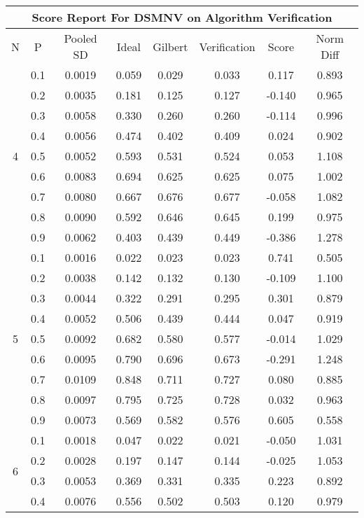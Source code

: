 \documentclass[11pt,a4paper]{report}
\begin{document}
\begin{longtable}{ | c | c || c | c | c | c | c | c | }
\hline
\multicolumn{8}{|c|}{ Score Report For DSMNV on Algorithm Verification} \\
\hline
N & P & Pooled SD &  Ideal &  Gilbert & Verification  & Score & Norm Diff \\
 \hline
 \hline
 \endhead
\multirow{9}{*}{4} & 0.1 & 0.0019 & 0.059 & 0.029 & 0.033 & 0.117 & 0.893 \\
 & 0.2 & 0.0035 & 0.181 & 0.125 & 0.127 & -0.140 & 0.965 \\
 & 0.3 & 0.0058 & 0.330 & 0.260 & 0.260 & -0.114 & 0.996 \\
 & 0.4 & 0.0056 & 0.474 & 0.402 & 0.409 & 0.024 & 0.902 \\
 & 0.5 & 0.0052 & 0.593 & 0.531 & 0.524 & 0.053 & 1.108 \\
 & 0.6 & 0.0083 & 0.694 & 0.625 & 0.625 & 0.075 & 1.002 \\
 & 0.7 & 0.0080 & 0.667 & 0.676 & 0.677 & -0.058 & 1.082 \\
 & 0.8 & 0.0090 & 0.592 & 0.646 & 0.645 & 0.199 & 0.975 \\
 & 0.9 & 0.0062 & 0.403 & 0.439 & 0.449 & -0.386 & 1.278 \\
 \hline
\multirow{9}{*}{5} & 0.1 & 0.0016 & 0.022 & 0.023 & 0.023 & 0.741 & 0.505 \\
 & 0.2 & 0.0038 & 0.142 & 0.132 & 0.130 & -0.109 & 1.100 \\
 & 0.3 & 0.0044 & 0.322 & 0.291 & 0.295 & 0.301 & 0.879 \\
 & 0.4 & 0.0052 & 0.506 & 0.439 & 0.444 & 0.047 & 0.919 \\
 & 0.5 & 0.0092 & 0.682 & 0.580 & 0.577 & -0.014 & 1.029 \\
 & 0.6 & 0.0095 & 0.790 & 0.696 & 0.673 & -0.291 & 1.248 \\
 & 0.7 & 0.0109 & 0.848 & 0.711 & 0.727 & 0.080 & 0.885 \\
 & 0.8 & 0.0097 & 0.795 & 0.725 & 0.728 & 0.032 & 0.963 \\
 & 0.9 & 0.0073 & 0.569 & 0.582 & 0.576 & 0.605 & 0.558 \\
 \hline
\multirow{9}{*}{6} & 0.1 & 0.0018 & 0.047 & 0.022 & 0.021 & -0.050 & 1.031 \\
 & 0.2 & 0.0028 & 0.197 & 0.147 & 0.144 & -0.025 & 1.053 \\
 & 0.3 & 0.0053 & 0.369 & 0.331 & 0.335 & 0.223 & 0.892 \\
 & 0.4 & 0.0076 & 0.556 & 0.502 & 0.503 & 0.120 & 0.979 \\

\end{longtable}
\end{document}
